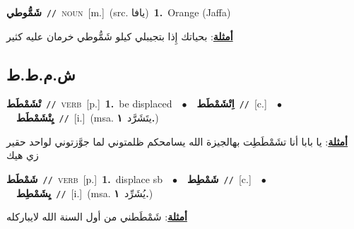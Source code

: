 \documentclass[10pt,a4paper,twoside]{article} %
\begin{document}
\begin{multicols}{2}
{\setlength\topsep{0pt}\textbf{\foreignlanguage{arabic}{شَمُّوطي}}\ {\color{gray}\texttt{//}\color{black}}\ \textsc{noun}\ [m.]\ (src. \color{gray}\foreignlanguage{arabic}{يافا}\color{black})\ \textbf{1.}~Orange (Jaffa)\  \begin{flushright}\color{gray}\foreignlanguage{arabic}{\textbf{\underline{\foreignlanguage{arabic}{أمثلة}}}: بحياتك إِذا بتجيبلي كيلو شَمُّوطي خرمان عليه كثير}\end{flushright}\color{black}} \vspace{2mm}

\vspace{-3mm}
\subsection*{\color{blue}\foreignlanguage{arabic}{ش.م.ط.ط}\color{blue}{}} 

{\setlength\topsep{0pt}\textbf{\foreignlanguage{arabic}{تْشَمْطَط}}\ {\color{gray}\texttt{//}\color{black}}\ \textsc{verb}\ [p.]\ \textbf{1.}~be displaced\ \ $\bullet$\ \ \setlength\topsep{0pt}\textbf{\foreignlanguage{arabic}{اِتْشَمْطَط}}\ {\color{gray}\texttt{//}\color{black}}\ [c.]\ \ $\bullet$\ \ \setlength\topsep{0pt}\textbf{\foreignlanguage{arabic}{يِتْشَمْطَط}}\ {\color{gray}\texttt{//}\color{black}}\ [i.]\ \color{gray}(msa. \foreignlanguage{arabic}{يتَشَرَّد}~\foreignlanguage{arabic}{\textbf{١.}})\color{black}\  \begin{flushright}\color{gray}\foreignlanguage{arabic}{\textbf{\underline{\foreignlanguage{arabic}{أمثلة}}}: يا بابا أنا تشَمْطَطِت بهالجيزة الله يسامحكم ظلمتوني لما جوَّزتوني لواحد حقير زي هيك}\end{flushright}\color{black}} \vspace{2mm}

{\setlength\topsep{0pt}\textbf{\foreignlanguage{arabic}{شَمْطَط}}\ {\color{gray}\texttt{//}\color{black}}\ \textsc{verb}\ [p.]\ \textbf{1.}~displace sb\ \ $\bullet$\ \ \setlength\topsep{0pt}\textbf{\foreignlanguage{arabic}{شَمْطِط}}\ {\color{gray}\texttt{//}\color{black}}\ [c.]\ \ $\bullet$\ \ \setlength\topsep{0pt}\textbf{\foreignlanguage{arabic}{يِشَمْطِط}}\ {\color{gray}\texttt{//}\color{black}}\ [i.]\ \color{gray}(msa. \foreignlanguage{arabic}{يُشَرِّد}~\foreignlanguage{arabic}{\textbf{١.}})\color{black}\  \begin{flushright}\color{gray}\foreignlanguage{arabic}{\textbf{\underline{\foreignlanguage{arabic}{أمثلة}}}: شَمْطَطني من أول السنة الله لايباركله}\end{flushright}\color{black}} \vspace{2mm}


\end{multicols}
\end{document}
